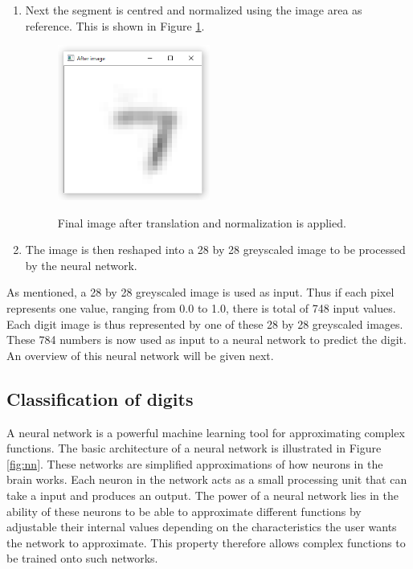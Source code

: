 \begin{enumerate}
\item Next the segment is centred and normalized using the image area as reference.  This is shown in Figure \ref{fig:final}.

\begin{figure}
  \centering
  \includegraphics[width=5cm]{TranslateAndScale}\\
  \caption{Final image after translation and normalization is applied.}
  \label{fig:final}
\end{figure}

\item The image is then reshaped into a 28 by 28 greyscaled image to be processed by the neural network.
\end{enumerate}
As mentioned, a 28 by 28 greyscaled image is used as input. Thus if each pixel represents one value, ranging from 0.0 to 1.0, there is total of 748 input values. Each digit image is thus represented by  one of these 28 by 28 greyscaled images. These 784 numbers is now used as input to a neural network to predict the digit. An overview of this neural network will be given next.

\subsection{Classification of digits}

A neural network is a powerful machine learning tool for approximating complex functions. The basic architecture of a neural network is illustrated in Figure \ref{fig:nn}. These networks are simplified approximations of how neurons in the brain works. Each neuron in the network acts as a small processing unit that can take a input and produces an output. The power of a neural network lies in the ability of these neurons to be able to approximate different functions by adjustable their internal values depending on the characteristics the user wants the network to approximate. This property therefore allows complex functions to be trained onto such networks.

